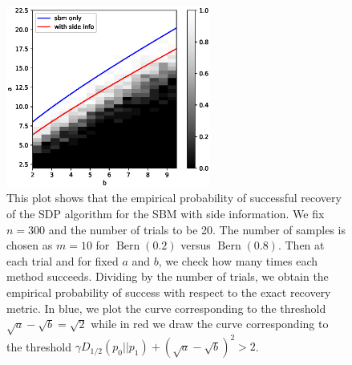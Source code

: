 \documentclass{ctexart}
\DeclareMathOperator{\Bern}{Bern}
\begin{document}
\begin{figure}
	\centering
	\includegraphics[width=0.6\textwidth]{sdp_si.eps}
	\caption{This plot shows that the empirical probability of successful recovery of the SDP algorithm 
	for the SBM with side information. We fix $n=300$ and the number of trials to be 20. The number of samples is chosen as $m=10$ for $\Bern(0.2)$ versus $\Bern(0.8)$. Then
	at each trial and for fixed $a$ and $b$, we check how many times each method succeeds. Dividing
	by the number of trials, we obtain the empirical probability of success with respect to
	the exact recovery metric. In blue, we plot the curve corresponding to the threshold $\sqrt{a}-\sqrt{b}=\sqrt{2}$ while in red we draw the curve corresponding to the threshold $\gamma D_{1/2}(p_0||p_1)  + (\sqrt{a} - \sqrt{b})^2 > 2$.}
\end{figure}
\end{document}
